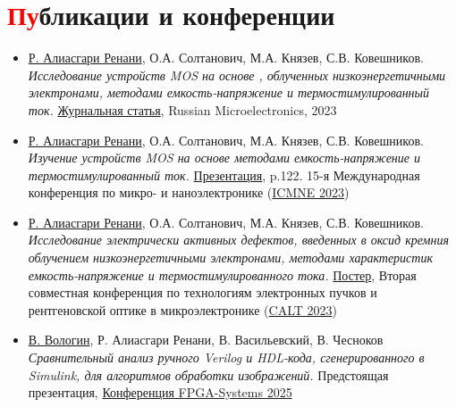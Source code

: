 \documentclass[a4paper, 10pt]{article} %
\newcommand{\resumeSubHeadingListStart}{\begin{itemize}[leftmargin=0.0in, label={}]}
\newcommand{\resumeSubHeadingListEnd}{\end{itemize}}
\begin{document}
\section{\textcolor{red}{Пу}бликации и конференции}
\resumeSubHeadingListStart
    \item \underline{Р. Алиасгари Ренани}, О.А. Солтанович, М.А. Князев, С.В. Ковешников. \\ \textit{Исследование устройств MOS на основе , облученных низкоэнергетичными электронами, методами емкость-напряжение и термостимулированный ток.} \href{https://doi.org/10.1134/S1063739723600516}{Журнальная статья}, Russian Microelectronics, 2023
    \item \underline{Р. Алиасгари Ренани}, О.А. Солтанович, М.А. Князев, С.В. Ковешников. \\ \textit{Изучение устройств MOS на основе  методами емкость-напряжение и термостимулированный ток.} \href{https://icmne.ftian.ru/wp-content/uploads/icmne-2023_e-version.pdf}{Презентация}, p.122. 15-я Международная конференция по микро- и наноэлектронике (\href{https://icmne.ftian.ru}{ICMNE 2023})
    \item \underline{Р. Алиасгари Ренани}, О.А. Солтанович, М.А. Князев, С.В. Ковешников. \\ \textit{Исследование электрически активных дефектов, введенных в оксид кремния облучением низкоэнергетичными электронами, методами характеристик емкость-напряжение и термостимулированного тока.} \href{https://cebt23.iptm.ru/download/numbered/91.pdf}{Постер}, Вторая совместная конференция по технологиям электронных пучков и рентгеновской оптике в микроэлектронике (\href{https://cebt23.iptm.ru}{CALT 2023})
    \item \underline{В. Вологин}, Р. Алиасгари Ренани, В. Васильевский, В. Чесноков \\ \textit{Сравнительный анализ ручного Verilog и HDL-кода, сгенерированного в Simulink, для алгоритмов обработки изображений.} Предстоящая презентация, \href{https://meetups.yadro.com/fpga-msk-1125/}{Конференция FPGA-Systems 2025}
    
\resumeSubHeadingListEnd
\vspace{-22pt} %

\end{document}
